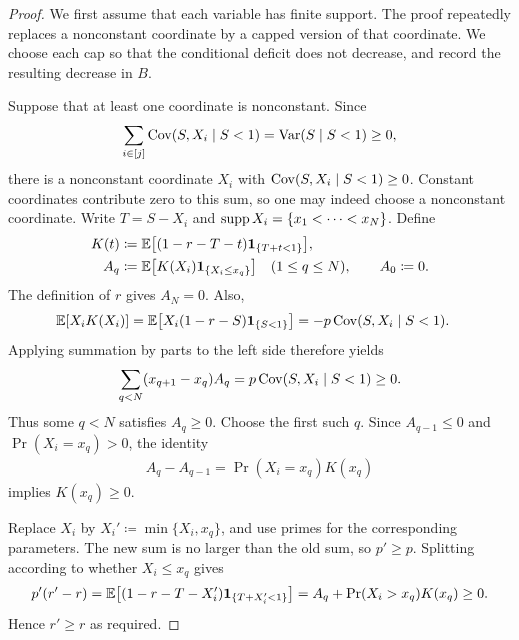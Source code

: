 \begin{proof}
We first assume that each variable has finite support. The proof repeatedly replaces a nonconstant coordinate by a capped version of that coordinate. We choose each cap so that the conditional deficit does not decrease, and record the resulting decrease in $B$.

Suppose that at least one coordinate is nonconstant. Since
\begin{align*}
 \sum_{i\in[j]}\operatorname{Cov}(S,X_i\mid S<1)=\operatorname{Var}(S\mid S<1)\ge0,
\end{align*}
there is a nonconstant coordinate $X_i$ with $\operatorname{Cov}(S,X_i\mid S<1)\ge0$. Constant coordinates contribute zero to this sum, so one may indeed choose a nonconstant coordinate. Write $T=S-X_i$ and $\operatorname{supp} X_i=\{x_1<\cdots<x_N\}$. Define
\begin{align*}
 K(t)&\coloneqq\mathbb E\bigl[(1-r-T-t)\mathbf 1_{\{T+t<1\}}\bigr],\\
 A_q&\coloneqq\mathbb E\bigl[K(X_i)\mathbf 1_{\{X_i\le x_q\}}\bigr]
 \quad (1\le q\le N),
 \qquad A_0\coloneqq0.
\end{align*}
The definition of $r$ gives $A_N=0$. Also,
\begin{align*}
 \mathbb E[X_iK(X_i)]
 &=\mathbb E\bigl[X_i(1-r-S)\mathbf 1_{\{S<1\}}\bigr]
 =-p\operatorname{Cov}(S,X_i\mid S<1).
\end{align*}
Applying summation by parts to the left side therefore yields
\begin{align*}
 \sum_{q<N}(x_{q+1}-x_q)A_q
 =p\operatorname{Cov}(S,X_i\mid S<1)\ge0.
\end{align*}
Thus some $q<N$ satisfies $A_q\ge0$. Choose the first such $q$. Since $A_{q-1}\le0$ and $\Pr(X_i=x_q)>0$, the identity
\begin{align*}
 A_q-A_{q-1}=\Pr(X_i=x_q)K(x_q)
\end{align*}
implies $K(x_q)\ge0$.

Replace $X_i$ by $X_i'\coloneqq\min\{X_i,x_q\}$, and use primes for the corresponding parameters. The new sum is no larger than the old sum, so $p'\ge p$. Splitting according to whether $X_i\le x_q$ gives
\begin{align*}
 p'(r'-r)
 =\mathbb E\bigl[(1-r-T-X_i')\mathbf 1_{\{T+X_i'<1\}}\bigr]
 =A_q+\Pr(X_i>x_q)K(x_q)\ge0.
\end{align*}
Hence $r'\ge r$ as required.


\end{proof}
